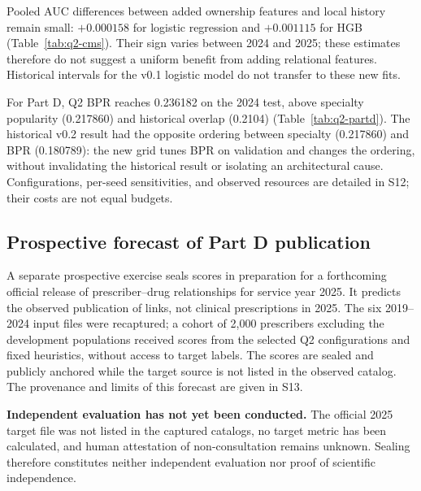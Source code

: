 Pooled AUC differences between added ownership features and local history remain small: $+0.000158$ for logistic regression and $+0.001115$ for HGB (Table~\ref{tab:q2-cms}). Their sign varies between 2024 and 2025; these estimates therefore do not suggest a uniform benefit from adding relational features. Historical intervals for the v0.1 logistic model do not transfer to these new fits.

\begin{table}[!htbp]
\centering\small
\caption{Q2 comparison on Medicare Part D: configurations selected on 2023 validation and micro Recall@10 on the 2024 test. Recall uses all observable positive links as its denominator; all 2,000 eligible prescribers, including those without positives, are retained in the cohort. No candidate sampling or new interval is used.}
\label{tab:q2-partd}

\end{table}

For Part D, Q2 BPR reaches 0.236182 on the 2024 test, above specialty popularity (0.217860) and historical overlap (0.2104) (Table~\ref{tab:q2-partd}). The historical v0.2 result had the opposite ordering between specialty (0.217860) and BPR (0.180789): the new grid tunes BPR on validation and changes the ordering, without invalidating the historical result or isolating an architectural cause. Configurations, per-seed sensitivities, and observed resources are detailed in S12; their costs are not equal budgets.

\subsection{Prospective forecast of Part D publication}
\label{sec:q2-forecast}

A separate prospective exercise seals scores in preparation for a forthcoming official release of prescriber--drug relationships for service year 2025. It predicts the observed publication of links, not clinical prescriptions in 2025. The six 2019--2024 input files were recaptured; a cohort of 2,000 prescribers excluding the development populations received scores from the selected Q2 configurations and fixed heuristics, without access to target labels. The scores are sealed and publicly anchored while the target source is not listed in the observed catalog\cite{hgbq2forecast}. The provenance and limits of this forecast are given in S13.

\textbf{Independent evaluation has not yet been conducted.} The official 2025 target file was not listed in the captured catalogs, no target metric has been calculated, and human attestation of non-consultation remains unknown. Sealing therefore constitutes neither independent evaluation nor proof of scientific independence.
